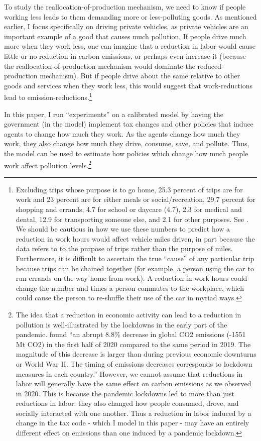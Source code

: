 \documentclass[letter, 12pt, epsf,leqno]{article}
\begin{document}
To study the reallocation-of-production mechanism, we need to know if people working less leads to them demanding more or less-polluting goods.  As mentioned earlier, I focus specifically on driving private vehicles, as private vehicles are an important example of a good that causes much pollution.  If people drive much more when they work less, one can imagine that a reduction in labor would cause little or no reduction in carbon emissions, or perhaps even increase it (because the reallocation-of-production mechanism would dominate the reduced-production mechanism).  But if people drive about the same relative to other goods and services when they work less, this would suggest that work-reductions lead to emission-reductions.\footnote{Excluding trips whose purpose is to go home, 25.3 percent of trips are for work and 23 percent are for either meals or social/recreation, 29.7 percent for shopping and errands, 4.7 for school or daycare (4.7), 2.3 for medical and dental, 12.9 for transporting someone else, and 2.1 for other purposes.  See \citet{transportation}.  We should be cautious in how we use these numbers to predict how a reduction in work hours would affect vehicle miles driven, in part because the data refers to to the purpose of trips rather than the purpose of miles.  Furthermore, it is difficult to ascertain the true ``cause'' of any particular trip because trips can be chained together (for example, a person using the car to run errands on the way home from work).  A reduction in work hours could change the number and times a person commutes to the workplace, which could cause the person to re-shuffle their use of the car in myriad ways.} %



In this paper, I run ``experiments'' on a calibrated model by having the government (in the model) implement tax changes and other policies that induce agents to change how much they work.  As the agents change how much they work, they also change how much they drive, consume, save, and pollute.  Thus, the model can be used to estimate how policies which change how much people work affect pollution levels.\footnote{
The idea that a reduction in economic activity can lead to a reduction in pollution is well-illustrated by the lockdowns in the early part of the pandemic.  \citet{liu} found ``an abrupt 8.8\% decrease in global CO2 emissions (-1551 Mt CO2) in the first half of 2020 compared to the same period in 2019. The magnitude of this decrease is larger than during previous economic downturns or World War II. The timing of emissions decreases corresponds to lockdown measures in each country.''  However, we cannot assume that reductions in labor will generally have the same effect on carbon emissions as we observed in 2020.  This is because the pandemic lockdowns led to more than just reductions in labor: they also changed how people consumed, drove, and socially interacted with one another.  Thus a reduction in labor induced by a change in the tax code - which I model in this paper - may have an entirely different effect on emissions than one induced by a pandemic lockdown.

}
\end{document}
